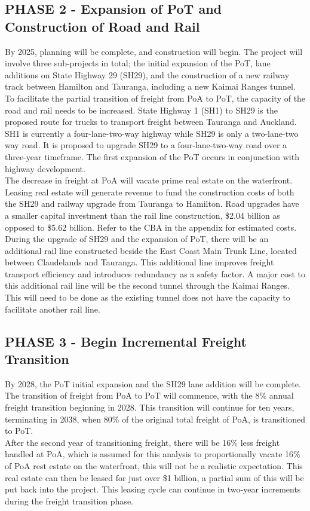 \subsection*{PHASE 2 - Expansion of PoT and Construction of Road and Rail}
By 2025, planning will be complete, and construction will begin. The project will involve three sub-projects in total; the initial expansion of the PoT, lane additions on State Highway 29 (SH29), and the construction of a new railway track between Hamilton and Tauranga, including a new Kaimai Ranges tunnel. 
\\To facilitate the partial transition of freight from PoA to PoT, the capacity of the road and rail needs to be increased. State Highway 1 (SH1) to SH29 is the proposed route for trucks to transport freight between Tauranga and Auckland. SH1 is currently a four-lane-two-way highway while SH29 is only a two-lane-two way road. It is proposed to upgrade SH29 to a four-lane-two-way road over a three-year timeframe. The first expansion of the PoT occurs in conjunction with highway development. 
\\The decrease in freight at PoA will vacate prime real estate on the waterfront. Leasing real estate will generate revenue to fund the construction costs of both the SH29 and railway upgrade from Tauranga to Hamilton. Road upgrades have a smaller capital investment than the rail line construction, \$2.04 billion as opposed to \$5.62 billion. Refer to the CBA in the appendix for estimated costs.
During the upgrade of SH29 and the expansion of PoT, there will be an additional rail line constructed beside the East Coast Main Trunk Line, located between Claudelands and Tauranga. This additional line improves freight transport efficiency and introduces redundancy as a safety factor. A major cost to this additional rail line will be the second tunnel through the Kaimai Ranges. This will need to be done as the existing tunnel does not have the capacity to facilitate another rail line. 


\subsection*{PHASE 3 - Begin Incremental Freight Transition}
By 2028, the PoT initial expansion and the SH29 lane addition will be complete. The transition of freight from PoA to PoT will commence, with the 8\% annual freight transition beginning in 2028. This transition will continue for ten years, terminating in 2038, when 80\% of the original total freight of PoA, is transitioned to PoT. 
\\After the second year of transitioning freight, there will be 16\% less freight handled at PoA, which is assumed for this analysis to proportionally vacate 16\% of PoA rest estate on the waterfront, this will not be a realistic expectation. This real estate can then be leased for just over \$1 billion, a partial sum of this will be put back into the project. This leasing cycle can continue in two-year increments during the freight transition phase. 

